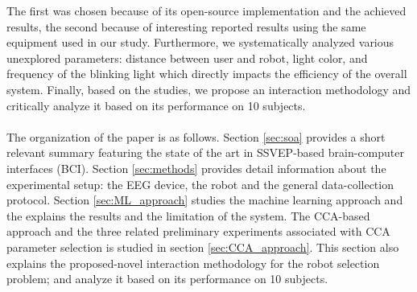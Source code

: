 \documentclass{svmult}
\begin{document}
The first was chosen because of its open-source implementation and the achieved results, the second because of interesting reported results using the same equipment used in our study. Furthermore, we systematically analyzed various unexplored parameters: distance between user and robot, light color, and frequency of the blinking light which directly impacts the efficiency of the overall system. Finally, based on the studies, we propose an interaction methodology and critically analyze it based on its performance on 10 subjects.\\
\\
The organization of the paper is as follows. Section \ref{sec:soa} provides a short relevant summary featuring the state of the art in SSVEP-based brain-computer interfaces (BCI). Section \ref{sec:methods} provides detail information about the experimental setup: the EEG device, the robot and the general data-collection protocol. Section \ref{sec:ML_approach} studies the machine learning approach and the explains the results and the limitation of the system. The CCA-based approach and the three related preliminary experiments associated with CCA parameter selection is studied in section \ref{sec:CCA_approach}. This section also explains the proposed-novel interaction methodology for the robot selection problem; and analyze it based on its performance on 10 subjects. 
\end{document}
